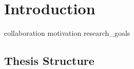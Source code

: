 \chapter{Introduction} \label{ch:intro}

{collaboration}
{motivation}
{research_goals}
\section{Thesis Structure}